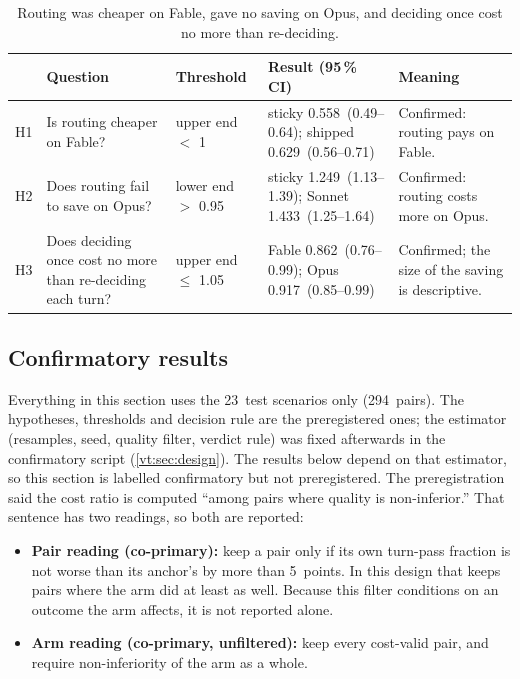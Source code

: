 \documentclass[11pt,letterpaper]{article}
\newcommand{\CfFableShippedPair}{0.629}
\newcommand{\CfFableShippedPairCI}{0.56--0.71}
\newcommand{\CfFableStickyPair}{0.558}
\newcommand{\CfFableStickyPairCI}{0.49--0.64}
\newcommand{\CfOpusSonnetPair}{1.433}
\newcommand{\CfOpusSonnetPairCI}{1.25--1.64}
\newcommand{\CfOpusStickyPair}{1.249}
\newcommand{\CfOpusStickyPairCI}{1.13--1.39}
\newcommand{\HThreeFable}{0.862}
\newcommand{\HThreeFableCI}{0.76--0.99}
\newcommand{\HThreeOpus}{0.917}
\newcommand{\HThreeOpusCI}{0.85--0.99}
\newcommand{\HThreeUpper}{1.05}
\newcommand{\HTwoLower}{0.95}
\newcommand{\NIMarginPts}{5}
\newcommand{\NTest}{23}
\newcommand{\NTestPairs}{294}
\begin{document}
\begin{table}[tbp]
\centering\footnotesize
\caption{Routing was cheaper on Fable, gave no saving on Opus, and deciding once cost no more than re-deciding.}
\label{tab:chyp}
\begin{tabularx}{\textwidth}{@{}l >{\raggedright\arraybackslash}p{} >{\raggedright\arraybackslash}p{}
  >{\raggedright\arraybackslash}p{} >{\raggedright\arraybackslash}X@{}}
\toprule
 & Question & Threshold & Result (95\,\% CI) & Meaning \\
\midrule
H1 & Is routing cheaper on Fable? & upper end $<$ 1 & sticky \CfFableStickyPair\ (\CfFableStickyPairCI); shipped
  \CfFableShippedPair\ (\CfFableShippedPairCI) & Confirmed: routing pays on Fable. \\
H2 & Does routing fail to save on Opus? & lower end $>$ \HTwoLower & sticky \CfOpusStickyPair\ (\CfOpusStickyPairCI);
  Sonnet \CfOpusSonnetPair\ (\CfOpusSonnetPairCI) & Confirmed: routing costs more on Opus. \\
H3 & Does deciding once cost no more than re-deciding each turn? & upper end $\le$ \HThreeUpper & Fable \HThreeFable\
  (\HThreeFableCI); Opus \HThreeOpus\ (\HThreeOpusCI) & Confirmed; the size of the saving is descriptive. \\
\bottomrule
\end{tabularx}
\end{table}
\subsection{Confirmatory results}\label{vt:sec:confirm}

Everything in this section uses the \NTest\ test scenarios only (\NTestPairs\ pairs). The hypotheses,
thresholds and decision rule are the preregistered ones; the estimator (resamples, seed, quality filter,
verdict rule) was fixed afterwards in the confirmatory script (\cref{vt:sec:design}). The results below depend on
that estimator, so this section is labelled confirmatory but not preregistered. The preregistration said the cost ratio is computed ``among pairs where quality is
non-inferior.'' That sentence has two readings, so both are reported:
\begin{itemize}
  \item \textbf{Pair reading (co-primary):} keep a pair only if its own turn-pass fraction is not worse than
    its anchor's by more than \NIMarginPts\ points. In this design that keeps pairs where the arm did at
    least as well. Because this filter conditions on an outcome the arm affects, it is not reported alone.
  \item \textbf{Arm reading (co-primary, unfiltered):} keep every cost-valid pair, and require non-inferiority of
    the arm as a whole.
\end{itemize}
\end{document}
